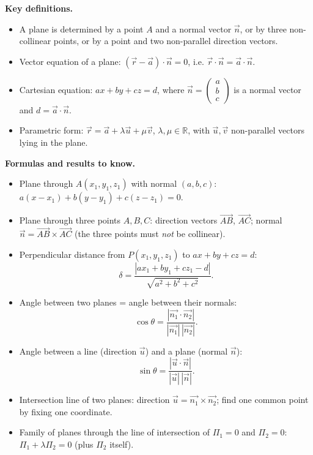 \documentclass[11pt]{article}
\newcommand{\cle}[1]{{\popxbold\color{popdark}#1}}
\begin{document}
\begin{bilan}
\textbf{Key definitions.}
\begin{itemize}
  \item A \cle{plane} is determined by a point $A$ and a \cle{normal vector} $\vec{n}$, or by three non-collinear points, or by a point and two non-parallel direction vectors.
  \item \cle{Vector equation} of a plane: $(\vec{r}-\vec{a})\cdot\vec{n}=0$, i.e. $\vec{r}\cdot\vec{n}=\vec{a}\cdot\vec{n}$.
  \item \cle{Cartesian equation}: $ax+by+cz=d$, where $\vec{n}=\begin{pmatrix}a\\b\\c\end{pmatrix}$ is a normal vector and $d=\vec{a}\cdot\vec{n}$.
  \item \cle{Parametric form}: $\vec{r}=\vec{a}+\lambda\vec{u}+\mu\vec{v}$, $\lambda,\mu\in\mathbb{R}$, with $\vec{u},\vec{v}$ non-parallel vectors lying in the plane.
\end{itemize}

\textbf{Formulas and results to know.}
\begin{itemize}
  \item Plane through $A(x_1,y_1,z_1)$ with normal $(a,b,c)$: $a(x-x_1)+b(y-y_1)+c(z-z_1)=0$.
  \item Plane through three points $A,B,C$: direction vectors $\overrightarrow{AB}$, $\overrightarrow{AC}$; normal $\vec{n}=\overrightarrow{AB}\times\overrightarrow{AC}$ (the three points must \emph{not} be collinear).
  \item \cle{Perpendicular distance} from $P(x_1,y_1,z_1)$ to $ax+by+cz=d$:
  \[ \delta=\frac{|ax_1+by_1+cz_1-d|}{\sqrt{a^2+b^2+c^2}}. \]
  \item \cle{Angle between two planes} = angle between their normals:
  \[ \cos\theta=\frac{|\vec{n_1}\cdot\vec{n_2}|}{|\vec{n_1}|\,|\vec{n_2}|}. \]
  \item \cle{Angle between a line} (direction $\vec{u}$) and a plane (normal $\vec{n}$):
  \[ \sin\theta=\frac{|\vec{u}\cdot\vec{n}|}{|\vec{u}|\,|\vec{n}|}. \]
  \item \cle{Intersection line of two planes}: direction $\vec{u}=\vec{n_1}\times\vec{n_2}$; find one common point by fixing one coordinate.
  \item \cle{Family of planes} through the line of intersection of $\Pi_1=0$ and $\Pi_2=0$: $\Pi_1+\lambda\Pi_2=0$ (plus $\Pi_2$ itself).
\end{itemize}


\end{bilan}
\end{document}
